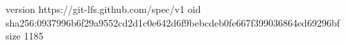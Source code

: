 version https://git-lfs.github.com/spec/v1
oid sha256:0937996b6f29a9552cd2d1c0e642d6f9bebcdeb0fe667f399036864ed69296bf
size 1185
